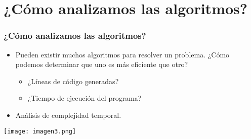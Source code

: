 \documentclass[aspectratio=169]{beamer}
\begin{document}
\section{¿Cómo analizamos las algoritmos?} %

\begin{frame}
\frametitle{¿Cómo analizamos las algoritmos?}
	\begin{itemize}
		\item Pueden existir muchos algoritmos para resolver un problema. ¿Cómo podemos determinar que uno es más eficiente que otro?
		\begin{itemize}
			\item ¿Líneas de código generadas?
			\item ¿Tiempo de ejecución del programa?
		\end{itemize}
		\item Análisis de complejidad temporal.
	\end{itemize}
\end{frame}

\begin{frame}
	\centering
	\texttt{[image: imagen3.png]}
\end{frame}
\end{document}
